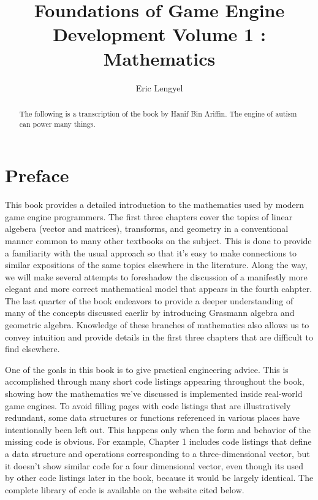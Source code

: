 \documentclass[a4paper,10pt]{article}
\title{Foundations of Game Engine Development Volume 1 : Mathematics}
\author{Eric Lengyel}
\begin{document}
\maketitle

\begin{abstract}

    The following is a transcription of the book by Hanif Bin Ariffin.
    The engine of autism can power many things.

\end{abstract}

\tableofcontents

\section{Preface}

This book provides a detailed introduction to the mathematics used by modern game engine programmers.
The first three chapters cover the topics of linear algebera (vector and matrices), transforms, and geometry in a conventional manner common to many other textbooks on the subject.
This is done to provide a familiarity with the usual approach so that it's easy to make connections to similar expositions of the same topics elsewhere in the literature.
Along the way, we will make several attempts to foreshadow the discussion of a manifestly more elegant and more correct mathematical model that appears in the fourth cahpter.
The last quarter of the book endeavors to provide a deeper understanding of many of the concepts discussed eaerlir by introducing Grasmann algebra and geometric algebra.
Knowledge of these branches of mathematics also allows us to convey intuition and provide details in the first three chapters that are difficult to find elsewhere.

One of the goals in this book is to give practical engineering advice.
This is accomplished through many short code listings appearing throughout the book, showing how the mathematics we've discussed is implemented inside real-world game engines.
To avoid filling pages with code listings that are illustratively redundant, some data structures or functions referenced in various places have intentionally been left out.
This happens only when the form and behavior of the missing code is obvious.
For example, Chapter 1 includes code listings that define a data structure and operations corresponding to a three-dimensional vector, but it doesn't show similar code for a four dimensional vector, even though its used by other code listings later in the book, because it would be largely identical.
The complete library of code is available on the website cited below.
\end{document}
